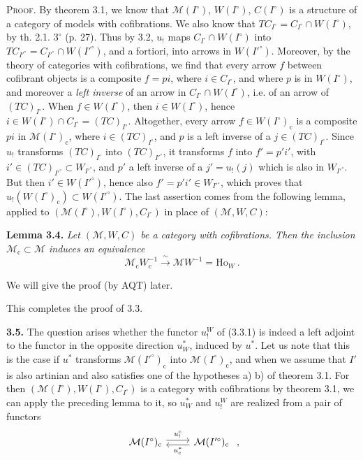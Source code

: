 \textsc{Proof}. By theorem 3.1, we know that $\mathcal{M}(I^\circ)$, $W(I^\circ)$, $C(I^\circ)$ is a structure of a category of models with cofibrations. We also know that $TC_{I^\circ}=C_{I^\circ}\cap W(I^\circ)$, by th. 2.1. $3^\circ$ (p. 27). Thus by 3.2, $u_!$ maps $C_{I^\circ}\cap W(I^\circ)$ into $TC_{I'^\circ}=C_{I'^\circ}\cap W(I'^\circ)$, and a fortiori, into arrows in $W(I'^\circ)$. Moreover, by the theory of categories with cofibrations, we find that every arrow $f$ between cofibrant objects is a composite $f=pi$, where $i\in C_{I^\circ}$, and where $p$ is in $W(I^\circ)$, and moreover a \textit{left inverse} of an arrow in $C_{I^\circ}\cap W(I^\circ)$, i.e. of an arrow of $(TC)_{I^\circ}$. When
$f\in W(I^\circ)$, then $i\in W(I^\circ)$, hence $i\in W(I^\circ)\cap C_{I^\circ}=(TC)_{I^\circ}$. Altogether, every arrow $f\in W(I^\circ)_{\mathrm{c}}$ is a composite $pi$ in $\mathcal{M}(I^\circ)_{\mathrm{c}}$, where $i\in(TC)_{I^\circ}$, and $p$ is a left inverse of a $j\in(TC)_{I^\circ}$. Since $u_!$ transforms $(TC)_{I^\circ}$ into $(TC)_{I'^\circ}$, it transforms $f$ into $f'=p'i'$, with $i'\in(TC)_{I'^\circ}\subset W_{I'^\circ}$, and $p'$ a left inverse of a $j'=u_!(j)$ which is also in $W_{I'^\circ}$. But then $i'\in W(I'^\circ)$, hence also $f'=p'i'\in W_{I'^\circ}$, which proves that $u_!(W(I^\circ)_{\mathrm{c}})\subset W(I'^\circ)$. The last assertion comes from the following lemma, applied to $(\mathcal{M}(I^\circ),W(I^\circ),C_{I^\circ})$ in place of $(\mathcal{M},W,C)$:

\textbf{Lemma 3.4.} \textit{Let $(\mathcal{M},W,C)$ be a category with cofibrations. Then the inclusion $\mathcal{M}_{\mathrm{c}}\subset\mathcal{M}$ induces an equivalence}
\[
\mathcal{M}_{\mathrm{c}}W_{\mathrm{c}}^{-1} \xrightarrow{\ \sim\ } \mathcal{M}W^{-1}=\mathrm{Ho}_W\ .
\]

We will give the proof (by AQT) later.

This completes the proof of 3.3.

\textbf{3.5.} The question arises whether the functor $u_!^W$ of (3.3.1) is indeed a left adjoint
to the functor in the opposite direction $u^*_W$, induced by $u^*$. Let us note that this is the case if $u^*$ transforms $\mathcal{M}(I'^\circ)_{\mathrm{c}}$ into $\mathcal{M}(I^\circ)_{\mathrm{c}}$, and when we assume that $I'$ is also artinian and also satisfies one of the hypotheses a) b) of theorem 3.1. For then $(\mathcal{M}(I^\circ),W(I^\circ),C_{I^\circ})$ is a category with cofibrations by theorem 3.1, we can apply the preceding lemma to it, so $u^*_W$ and $u_!^W$ are realized from a pair of functors
\[
\begin{tikzcd}
\mathcal{M}(I^\circ)_{\mathrm{c}} \arrow[r, shift left, "u_{!}^{\mathrm{c}}"] & \mathcal{M}(I'^\circ)_{\mathrm{c}} \arrow[l, shift left, "u_{\mathrm{c}}^*"]
\end{tikzcd}\ ,
\]